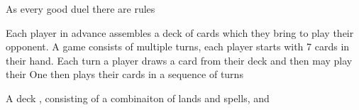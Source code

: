 \documentclass[
    a4paper,
    DIV=13,
    abstract=true,
    numbers=noenddot
]{scrartcl}
\begin{document}
As every good duel there are rules


Each player in advance assembles a deck of cards which they bring to play their opponent. A game consists of multiple turns, each player starts with 7 cards in their hand. Each turn a player draws a card from their deck and then may play their  One then plays their cards in a sequence of turns

A deck , consisting of a combinaiton of lands and spells, and

\printbibliography
\end{document}
